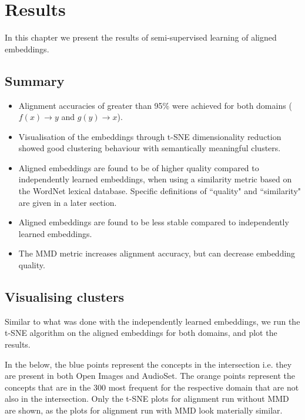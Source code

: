 \chapter{Results}

In this chapter we present the results of semi-supervised learning of aligned embeddings.


\section{Summary}
\begin{itemize}
    \item Alignment accuracies of greater than 95\% were achieved for both domains ($f(x) \rightarrow y$ and $g(y) \rightarrow x$).
    \item Visualisation of the embeddings through t-SNE dimensionality reduction showed good clustering behaviour with semantically meaningful clusters.
    \item Aligned embeddings are found to be of higher quality compared to independently learned embeddings, when using a similarity metric based on the WordNet lexical database. Specific definitions of ``quality" and ``similarity" are given in a later section.
    \item Aligned embeddings are found to be less stable compared to independently learned embeddings. 
    \item The MMD metric increases alignment accuracy, but can decrease embedding quality. 
\end{itemize}


\section{Visualising clusters}
Similar to what was done with the independently learned embeddings, we run the t-SNE algorithm on the aligned embeddings for both domains, and plot the results.

In the below, the blue points represent the concepts in the intersection i.e. they are present in both Open Images and AudioSet. The orange points represent the concepts that are in the 300 most frequent for the respective domain that are not also in the intersection. Only the t-SNE plots for alignment run without MMD are shown, as the plots for alignment run with MMD look materially similar. 

